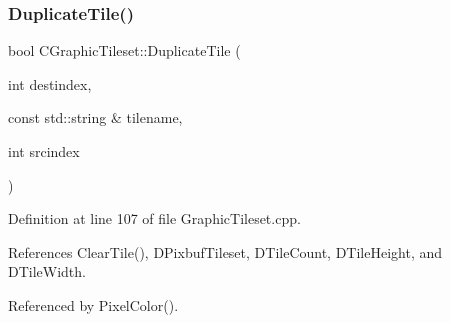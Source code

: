 \subsubsection{\texorpdfstring{Duplicate\+Tile()}{DuplicateTile()}}
{\footnotesize\ttfamily bool C\+Graphic\+Tileset\+::\+Duplicate\+Tile (\begin{DoxyParamCaption}\item[{int}]{destindex,  }\item[{const std\+::string \&}]{tilename,  }\item[{int}]{srcindex }\end{DoxyParamCaption})}



Definition at line 107 of file Graphic\+Tileset.\+cpp.



References Clear\+Tile(), D\+Pixbuf\+Tileset, D\+Tile\+Count, D\+Tile\+Height, and D\+Tile\+Width.



Referenced by Pixel\+Color().


